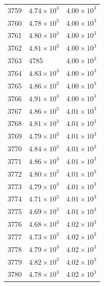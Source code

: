 \begin{table}[H]
\begin{tabular}{lll}
3759 & $\displaystyle 4.74 \times 10^{3}$ & $\displaystyle 4.00 \times 10^{3}$ \\
3760 & $\displaystyle 4.78 \times 10^{3}$ & $\displaystyle 4.00 \times 10^{3}$ \\
3761 & $\displaystyle 4.80 \times 10^{3}$ & $\displaystyle 4.00 \times 10^{3}$ \\
3762 & $\displaystyle 4.81 \times 10^{3}$ & $\displaystyle 4.00 \times 10^{3}$ \\
3763 & 4785 & $\displaystyle 4.00 \times 10^{3}$ \\
3764 & $\displaystyle 4.83 \times 10^{3}$ & $\displaystyle 4.00 \times 10^{3}$ \\
3765 & $\displaystyle 4.86 \times 10^{3}$ & $\displaystyle 4.00 \times 10^{3}$ \\
3766 & $\displaystyle 4.91 \times 10^{3}$ & $\displaystyle 4.00 \times 10^{3}$ \\
3767 & $\displaystyle 4.86 \times 10^{3}$ & $\displaystyle 4.01 \times 10^{3}$ \\
3768 & $\displaystyle 4.81 \times 10^{3}$ & $\displaystyle 4.01 \times 10^{3}$ \\
3769 & $\displaystyle 4.79 \times 10^{3}$ & $\displaystyle 4.01 \times 10^{3}$ \\
3770 & $\displaystyle 4.84 \times 10^{3}$ & $\displaystyle 4.01 \times 10^{3}$ \\
3771 & $\displaystyle 4.86 \times 10^{3}$ & $\displaystyle 4.01 \times 10^{3}$ \\
3772 & $\displaystyle 4.80 \times 10^{3}$ & $\displaystyle 4.01 \times 10^{3}$ \\
3773 & $\displaystyle 4.79 \times 10^{3}$ & $\displaystyle 4.01 \times 10^{3}$ \\
3774 & $\displaystyle 4.71 \times 10^{3}$ & $\displaystyle 4.01 \times 10^{3}$ \\
3775 & $\displaystyle 4.69 \times 10^{3}$ & $\displaystyle 4.01 \times 10^{3}$ \\
3776 & $\displaystyle 4.68 \times 10^{3}$ & $\displaystyle 4.02 \times 10^{3}$ \\
3777 & $\displaystyle 4.73 \times 10^{3}$ & $\displaystyle 4.02 \times 10^{3}$ \\
3778 & $\displaystyle 4.79 \times 10^{3}$ & $\displaystyle 4.02 \times 10^{3}$ \\
3779 & $\displaystyle 4.82 \times 10^{3}$ & $\displaystyle 4.02 \times 10^{3}$ \\
3780 & $\displaystyle 4.78 \times 10^{3}$ & $\displaystyle 4.02 \times 10^{3}$ \\

\end{tabular}
\end{table}
